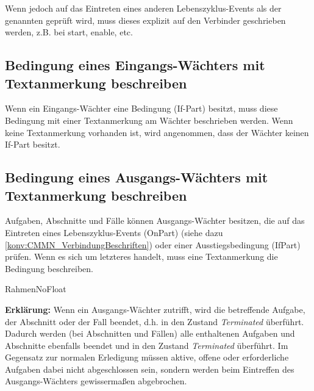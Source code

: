 \documentclass[12pt,report]{../../Templates/snetTeaching}
\begin{document}
Wenn jedoch auf das Eintreten eines anderen Lebenszyklus-Events als der genannten geprüft wird, muss dieses explizit auf den Verbinder geschrieben werden, z.B. bei start, enable, etc.










\subsection{Bedingung eines Eingangs-Wächters mit Textanmerkung beschreiben}

Wenn ein Eingangs-Wächter eine Bedingung (If-Part) besitzt, muss diese Bedingung mit einer Textanmerkung am Wächter beschrieben werden. Wenn keine Textanmerkung vorhanden ist, wird angenommen, dass der Wächter keinen If-Part besitzt. 

\begin{RahmenNoFloat}
	\hfill
\end{RahmenNoFloat}


\subsection{Bedingung eines Ausgangs-Wächters mit Textanmerkung beschreiben}

Aufgaben, Abschnitte und Fälle können Ausgangs-Wächter besitzen, die auf das Eintreten eines Lebenszyklus-Events (OnPart) (siehe dazu \ref{konv:CMMN_VerbindungBeschriften}) oder einer Ausstiegsbedingung (IfPart) prüfen. Wenn es sich um letzteres handelt, muss eine Textanmerkung die Bedingung beschreiben.

RahmenNoFloat
\begin{RahmenNoFloat}
	\hfill
\end{RahmenNoFloat}

\textbf{Erklärung:} Wenn ein Ausgangs-Wächter zutrifft, wird die betreffende Aufgabe, der Abschnitt oder der Fall beendet, d.h. in den Zustand \emph{Terminated} überführt. Dadurch werden (bei Abschnitten und Fällen) alle enthaltenen Aufgaben und Abschnitte ebenfalls beendet und in den Zustand \emph{Terminated} überführt. Im Gegensatz zur normalen Erledigung müssen aktive, offene oder erforderliche Aufgaben dabei nicht abgeschlossen sein, sondern werden beim Eintreffen des Ausgangs-Wächters gewissermaßen abgebrochen.
\end{document}
